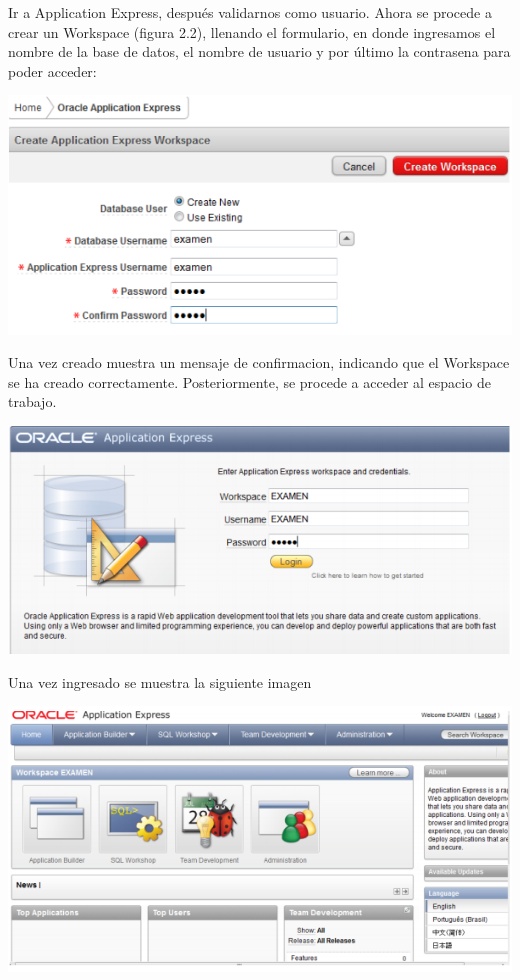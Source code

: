 \documentclass[12pt,letterpaper]{article}
\begin{document}
Ir a Application Express, despu\'es validarnos como usuario. Ahora se procede a
crear un Workspace (figura 2.2), llenando el formulario, en donde ingresamos el
nombre de la base de datos, el nombre de usuario y por \'ultimo la
contrasena para poder acceder:
\begin{center}
\includegraphics[width=15cm]{./IMG/img7}
\end{center}
Una vez creado muestra un mensaje de confirmacion, indicando que el
Workspace se ha creado correctamente. Posteriormente, se procede a acceder al
espacio de trabajo.
\begin{center}
\includegraphics[width=15cm]{./IMG/img8}
\end{center}
Una vez ingresado se muestra la siguiente imagen
\begin{center}
\includegraphics[width=15cm]{./IMG/img9}
\end{center}
\end{document}
